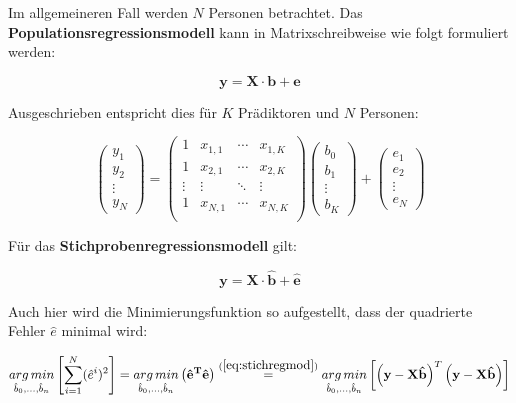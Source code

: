 \documentclass{article}
\numberwithin{equation}{section}
\begin{document}
Im allgemeineren Fall werden $N$ Personen betrachtet. Das \textbf{Populationsregressionsmodell} kann in Matrixschreibweise wie folgt formuliert werden:

\begin{equation}
\mathbf{y} = \mathbf{X} \cdot \mathbf{b} + \mathbf{e}
\label{eq:lin-multi-regression}
\end{equation}

Ausgeschrieben entspricht dies für $K$ Prädiktoren und $N$ Personen:

\begin{equation}
\begin{pmatrix}
y_1\\ y_2\\ \vdots\\ y_N
\end{pmatrix}
=
\begin{pmatrix}
1 & x_{1,1} & \cdots & x_{1,K}\\
1 & x_{2,1} & \cdots & x_{2,K}\\
\vdots & \vdots & \ddots & \vdots\\
1 & x_{N,1} & \cdots & x_{N,K}\\
\end{pmatrix}
\begin{pmatrix}
b_0\\ b_1\\ \vdots\\ b_K
\end{pmatrix}
+
\begin{pmatrix}
e_1\\ e_2\\ \vdots\\ e_N
\end{pmatrix}
\end{equation}

Für das \textbf{Stichprobenregressionsmodell} gilt:

\begin{equation}
\label{eq:stichregmod}
\mathbf{y} = \mathbf{X} \cdot \mathbf{\hat b} + \mathbf{\hat e}
\end{equation}

Auch hier wird die Minimierungsfunktion so aufgestellt, dass der quadrierte Fehler $\hat e$ minimal wird:

\begin{equation}
\underset{\hat b_0, \dots, \hat b_n}{arg\,min} \left[ \sum_{i=1}^N (\hat e^i)^2 \right] = \underset{\hat b_0, \dots, \hat b_n}{arg\,min} \left( \mathbf{\hat e^T} \mathbf{\hat e} \right) \overset{(\ref{eq:stichregmod})}{=} \underset{\hat b_0, \dots, \hat b_n}{arg\,min} \left[ \left( \mathbf{y} - \mathbf{X}\mathbf{\hat b} \right)^T \left( \mathbf{y} - \mathbf{X}\mathbf{\hat b} \right) \right]
\end{equation}
\end{document}
